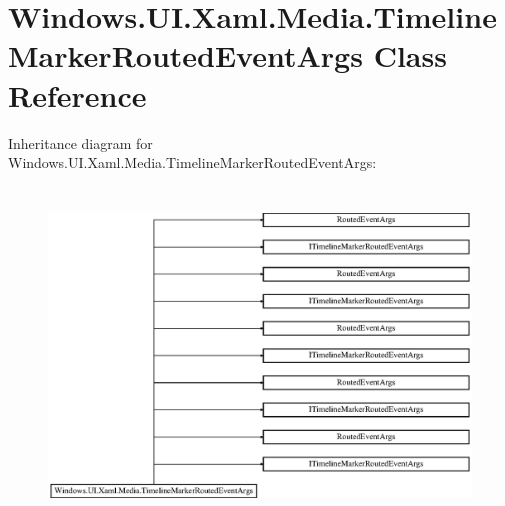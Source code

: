 \hypertarget{class_windows_1_1_u_i_1_1_xaml_1_1_media_1_1_timeline_marker_routed_event_args}{}\section{Windows.\+U\+I.\+Xaml.\+Media.\+Timeline\+Marker\+Routed\+Event\+Args Class Reference}
\label{class_windows_1_1_u_i_1_1_xaml_1_1_media_1_1_timeline_marker_routed_event_args}
Inheritance diagram for Windows.\+U\+I.\+Xaml.\+Media.\+Timeline\+Marker\+Routed\+Event\+Args\+:\begin{figure}[H]
\begin{center}
\leavevmode
\includegraphics[height=8.927536cm]{class_windows_1_1_u_i_1_1_xaml_1_1_media_1_1_timeline_marker_routed_event_args}
\end{center}
\end{figure}
